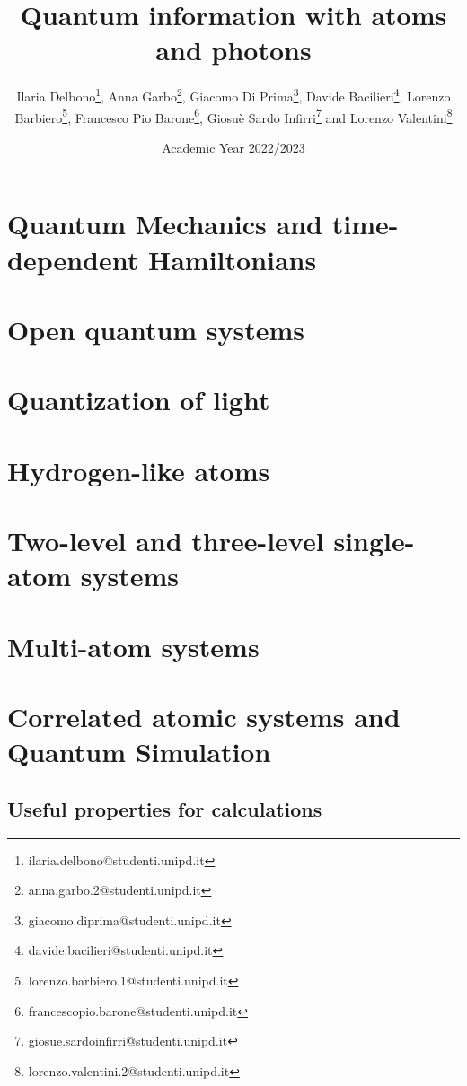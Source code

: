 \documentclass[a4paper, twoside, openright]{memoir}
\title{Quantum information with atoms and photons}
\author{Ilaria Delbono\thanks{ilaria.delbono@studenti.unipd.it},
    Anna Garbo\thanks{anna.garbo.2@studenti.unipd.it},
    Giacomo Di Prima\thanks{giacomo.diprima@studenti.unipd.it},
    Davide Bacilieri\thanks{davide.bacilieri@studenti.unipd.it},
    Lorenzo Barbiero\thanks{lorenzo.barbiero.1@studenti.unipd.it},
    Francesco Pio Barone\thanks{francescopio.barone@studenti.unipd.it},
    Giosuè Sardo Infirri\thanks{giosue.sardoinfirri@studenti.unipd.it}
    and Lorenzo Valentini\thanks{lorenzo.valentini.2@studenti.unipd.it}
}
\date{Academic Year 2022/2023}
\begin{document}
\firstpage
\secondpage
\restoregeometry

\fancyfoot[C]{\thepage}
\fancyfoot[L]{}
\fancyfoot[R]{}


\cleardoublepage
\begingroup
\hypersetup{hidelinks}
\tableofcontents
\endgroup
\newpage


\setlayout %



%


\chapter{Quantum Mechanics and time-dependent Hamiltonians}


\chapter{Open quantum systems}


\chapter{Quantization of light}


\chapter{Hydrogen-like atoms}



\chapter{Two-level and three-level single-atom systems}


\chapter{Multi-atom systems}


\chapter[Quantum Simulation]{Correlated atomic systems and Quantum Simulation}


\begin{appendix}    
    \chapter{Useful properties for calculations}
    
\end{appendix} 


\end{document}
